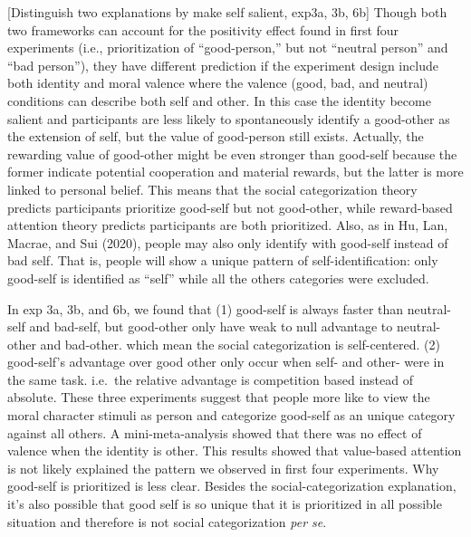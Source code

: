 \documentclass[
  english,
  man]{apa6}
\begin{document}
{[}Distinguish two explanations by make self salient, exp3a, 3b, 6b{]} Though both two frameworks can account for the positivity effect found in first four experiments (i.e., prioritization of ``good-person,'' but not ``neutral person'' and ``bad person''), they have different prediction if the experiment design include both identity and moral valence where the valence (good, bad, and neutral) conditions can describe both self and other. In this case the identity become salient and participants are less likely to spontaneously identify a good-other as the extension of self, but the value of good-person still exists. Actually, the rewarding value of good-other might be even stronger than good-self because the former indicate potential cooperation and material rewards, but the latter is more linked to personal belief. This means that the social categorization theory predicts participants prioritize good-self but not good-other, while reward-based attention theory predicts participants are both prioritized. Also, as in Hu, Lan, Macrae, and Sui (2020), people may also only identify with good-self instead of bad self. That is, people will show a unique pattern of self-identification: only good-self is identified as ``self'' while all the others categories were excluded.

In exp 3a, 3b, and 6b, we found that (1) good-self is always faster than neutral-self and bad-self, but good-other only have weak to null advantage to neutral-other and bad-other. which mean the social categorization is self-centered. (2) good-self's advantage over good other only occur when self- and other- were in the same task. i.e.~the relative advantage is competition based instead of absolute. These three experiments suggest that people more like to view the moral character stimuli as person and categorize good-self as an unique category against all others. A mini-meta-analysis showed that there was no effect of valence when the identity is other. This results showed that value-based attention is not likely explained the pattern we observed in first four experiments. Why good-self is prioritized is less clear. Besides the social-categorization explanation, it's also possible that good self is so unique that it is prioritized in all possible situation and therefore is not social categorization \emph{per se}.
\end{document}
